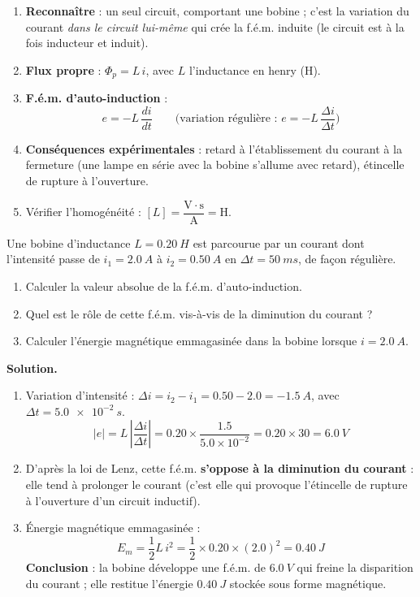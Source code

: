 \documentclass[11pt]{article}
\begin{document}
\begin{methode}
\begin{enumerate}
\item \textbf{Reconnaître} : un seul circuit, comportant une bobine ; c'est la variation du courant \emph{dans le circuit lui-même} qui crée la f.é.m. induite (le circuit est à la fois inducteur et induit).
\item \textbf{Flux propre} : $\Phi_p = L\,i$, avec $L$ l'inductance en henry (H).
\item \textbf{F.é.m. d'auto-induction} :
\[ e = -L\,\dfrac{di}{dt} \qquad \text{(variation régulière : } e = -L\,\dfrac{\Delta i}{\Delta t}\text{)} \]
\item \textbf{Conséquences expérimentales} : retard à l'établissement du courant à la fermeture (une lampe en série avec la bobine s'allume avec retard), étincelle de rupture à l'ouverture.
\item Vérifier l'homogénéité : $[L] = \dfrac{\mathrm{V}\cdot\mathrm{s}}{\mathrm{A}} = \mathrm{H}$.
\end{enumerate}
\end{methode}

\begin{exoresolu}
Une bobine d'inductance $L = \SI{0,20}{H}$ est parcourue par un courant dont l'intensité passe de $i_1 = \SI{2,0}{A}$ à $i_2 = \SI{0,50}{A}$ en $\Delta t = \SI{50}{ms}$, de façon régulière.
\begin{enumerate}
\item Calculer la valeur absolue de la f.é.m. d'auto-induction.
\item Quel est le rôle de cette f.é.m. vis-à-vis de la diminution du courant ?
\item Calculer l'énergie magnétique emmagasinée dans la bobine lorsque $i = \SI{2,0}{A}$.
\end{enumerate}
\tcblower
\textbf{Solution.}
\begin{enumerate}
\item Variation d'intensité : $\Delta i = i_2 - i_1 = \num{0,50} - \num{2,0} = \SI{-1,5}{A}$, avec $\Delta t = \SI{5,0e-2}{s}$.
\[ |e| = L\,\left|\dfrac{\Delta i}{\Delta t}\right| = \num{0,20} \times \dfrac{\num{1,5}}{\num{5,0}\times 10^{-2}} = \num{0,20} \times 30 = \SI{6,0}{V} \]
\item D'après la loi de Lenz, cette f.é.m. \textbf{s'oppose à la diminution du courant} : elle tend à prolonger le courant (c'est elle qui provoque l'étincelle de rupture à l'ouverture d'un circuit inductif).
\item Énergie magnétique emmagasinée :
\[ E_m = \dfrac{1}{2}L\,i^2 = \dfrac{1}{2}\times \num{0,20} \times (\num{2,0})^2 = \SI{0,40}{J} \]
\textbf{Conclusion} : la bobine développe une f.é.m. de $\SI{6,0}{V}$ qui freine la disparition du courant ; elle restitue l'énergie $\SI{0,40}{J}$ stockée sous forme magnétique.
\end{enumerate}
\end{exoresolu}
\end{document}
